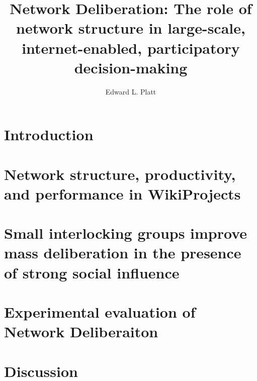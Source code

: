 \documentclass[thesis]{thesis-umich}
\title{Network Deliberation: The role of network structure in large-scale, internet-enabled, participatory decision-making}
\author{Edward L. Platt}
\begin{document}
\chapter{Introduction}
\label{chap:intro}


\chapter{Network structure, productivity, and performance in WikiProjects}
\label{chap:wp-prod-perf}


\chapter{Small interlocking groups improve mass deliberation in the presence
of strong social influence}
\label{chap:abm}


\chapter{Experimental evaluation of Network Deliberaiton}
\label{chap:experiment}


\chapter{Discussion}
\label{chap:discussion}

%

\appendix
\label{apx:nk}





\end{document}
